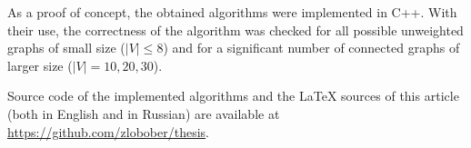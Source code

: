 As a proof of concept, the obtained algorithms were implemented in C++. With their use, the correctness of the algorithm was checked for all possible unweighted graphs of small size ($|V| \leq 8$) and for a significant number of connected graphs of larger size ($|V| = 10, 20, 30$). 









Source code of the implemented algorithms and the LaTeX sources of this article (both in English and in Russian) are available at \url{https://github.com/zlobober/thesis}.
